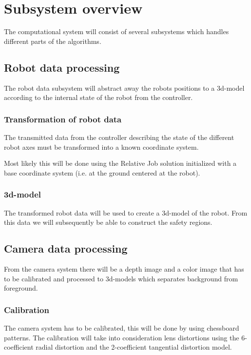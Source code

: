 \documentclass[10pt,a4paper,twocolumn,english]{article}
\begin{document}
\section{Subsystem overview}

The computational system will consist of several subsystems which handles different parts of the algorithms.

\subsection{Robot data processing}

The robot data subsystem will abstract away the robots positions to a 3d-model according to the internal state of the robot from the controller.

\subsubsection{Transformation of robot data}

The transmitted data from the controller describing the state of the different robot axes must be transformed into a known coordinate system.

Most likely this will be done using the Relative Job solution initialized with a base coordinate system (i.e. at the ground centered at the robot).

\subsubsection{3d-model}

The transformed robot data will be used to create a 3d-model of the robot. From this data we will subsequently be able to construct the safety regions.

\subsection{Camera data processing}

From the camera system there will be a depth image and a color image that has to be calibrated and processed to 3d-models which separates background from foreground.

\subsubsection{Calibration}

The camera system has to be calibrated, this will be done by using chessboard patterns. The calibration will take into consideration lens distortions using the 6-coefficient radial distortion and the 2-coefficient tangential distortion model.
\end{document}
